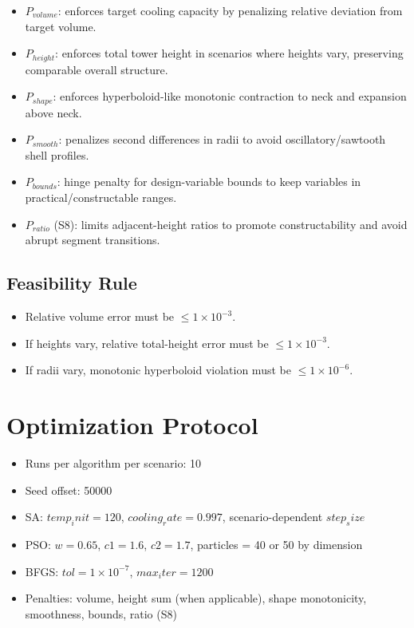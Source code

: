\begin{itemize}
\item \(P_{volume}\): enforces target cooling capacity by penalizing relative deviation from target volume.
\item \(P_{height}\): enforces total tower height in scenarios where heights vary, preserving comparable overall structure.
\item \(P_{shape}\): enforces hyperboloid-like monotonic contraction to neck and expansion above neck.
\item \(P_{smooth}\): penalizes second differences in radii to avoid oscillatory/sawtooth shell profiles.
\item \(P_{bounds}\): hinge penalty for design-variable bounds to keep variables in practical/constructable ranges.
\item \(P_{ratio}\) (S8): limits adjacent-height ratios to promote constructability and avoid abrupt segment transitions.
\end{itemize}

\section{Feasibility Rule}

\begin{itemize}
\item Relative volume error must be \(\leq 1 \times 10^{-3}\).
\item If heights vary, relative total-height error must be \(\leq 1 \times 10^{-3}\).
\item If radii vary, monotonic hyperboloid violation must be \(\leq 1 \times 10^{-6}\).
\end{itemize}

\chapter{Optimization Protocol}

\begin{itemize}
\item Runs per algorithm per scenario: 10
\item Seed offset: 50000
\item SA: \(temp_init=120\), \(cooling_rate=0.997\), scenario-dependent \(step_size\)
\item PSO: \(w=0.65\), \(c1=1.6\), \(c2=1.7\), particles = 40 or 50 by dimension
\item BFGS: \(tol=1 \times 10^{-7}\), \(max_iter=1200\)
\item Penalties: volume, height sum (when applicable), shape monotonicity, smoothness, bounds, ratio (S8)
\end{itemize}

